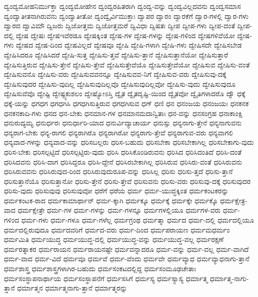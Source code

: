 {ದ್ವಂದ್ವಮೋಹನಿರ್ಮುಕ್ತಾ
ದ್ವಂದ್ವಮೋಹೇನ
ದ್ವಂದ್ವರಹಿತರಾಗಿ
ದ್ವಂದ್ವ-ವನ್ನು
ದ್ವಂದ್ವವಿಲ್ಲದವನು
ದ್ವಂದ್ವಸಮಾಸ
ದ್ವಂದ್ವಾತೀತನಾಗಿರುವನು
ದ್ವಂದ್ವಾತೀತೋ
ದ್ವಂದ್ವೈರ್ವಿಮುಕ್ತಾಃ
ದ್ವಾಪರ
ದ್ವಾರಂ
ದ್ವಾರಕೆಗೆ
ದ್ವಾರ-ಗಳಲ್ಲಿ
ದ್ವಾರ-ಗಳು
ದ್ವಾರದ
ದ್ವಾವಿಮೌ
ದ್ವಿಜರು
ದ್ವಿಜೋತ್ತಮ
ದ್ವಿಜೋತ್ತಮರೆ
ದ್ವಿವಿಧಾ
ದ್ವಿಷತಃ
ದ್ವೀಪ
ದ್ವೀಪ-ಗಳು
ದ್ವೀಪ-ದಂತೆ
ದ್ವೀಪ-ದಲ್ಲಿ
ದ್ವೇಷ
ದ್ವೇಷಃ
ದ್ವೇಷಇವೆರಡೂ
ದ್ವೇಷಕ್ಕಿಂತ
ದ್ವೇಷ-ಗಳ
ದ್ವೇಷ-ಗಳನ್ನು
ದ್ವೇಷ-ಗಳಿಂದ
ದ್ವೇಷಗಳಿವೆಯೋ
ದ್ವೇಷ-ಗಳು
ದ್ವೇಷದ
ದ್ವೇಷ-ದಿಂದ
ದ್ವೇಷವಿಲ್ಲದೆ
ದ್ವೇಷವೂ
ದ್ವೇಷಿ
ದ್ವೇಷಿ-ಗಳಾಗಿ
ದ್ವೇಷಿ-ಗಳು
ದ್ವೇಷಿಸದೇ
ದ್ವೇಷಿಸಬೇಡ
ದ್ವೇಷಿಸಿದರೂ
ದ್ವೇಷಿಸಿದರೆ
ದ್ವೇಷಿ-ಸುತ್ತ
ದ್ವೇಷಿಸು-ತ್ತವೆ
ದ್ವೇಷಿಸು-ತ್ತಾನೆ
ದ್ವೇಷಿಸುತ್ತಾನೆಯೋ
ದ್ವೇಷಿಸುತ್ತಾರೆ
ದ್ವೇಷಿಸುತ್ತಿರುವ
ದ್ವೇಷಿಸು-ತ್ತೇನೆ
ದ್ವೇಷಿಸು-ತ್ತೇವೆ
ದ್ವೇಷಿಸುತ್ತೇವೆಯೊ
ದ್ವೇಷಿಸುತ್ತೇವೆಯೋ
ದ್ವೇಷಿಸುವ
ದ್ವೇಷಿಸು-ವಂತೆ
ದ್ವೇಷಿಸುವನೊ
ದ್ವೇಷಿಸು-ವರು
ದ್ವೇಷಿಸುವವನನ್ನೂ
ದ್ವೇಷಿಸುವವ-ನಿಗೆ
ದ್ವೇಷಿಸುವ-ವರು
ದ್ವೇಷಿಸುವು-ದಕ್ಕೆ
ದ್ವೇಷಿಸುವುದರ
ದ್ವೇಷಿಸು-ವುದಿಲ್ಲ
ದ್ವೇಷಿಸುವುದಿಲ್ಲವೊ
ದ್ವೇಷಿಸುವುದಿಲ್ಲವೋ
ದ್ವೇಷಿಸು-ವುದು
ದ್ವೇಷಿಸುವುದೂ
ದ್ವೇಷಿಸುವೆವೊ
ದ್ವೇಷ್ಟಿ
ದ್ವೇಷ್ಟ್ಯಕುಶಲಂ
ದ್ವೇಷ್ಯೋಽಸ್ತಿ
ದ್ವೈತ
ದ್ವೈತದೃಷ್ಟಿ-ಯಿಂದ
ದ್ವೈತವೋ
ದ್ವೈತಿಗಳಾದರೊ
ದ್ವೌ
ಧಕ್ಕೆ
ಧಕ್ಕೆ-ಯನ್ನು
ಧಗಧಗ
ಧಗಧಗಿಸಿ
ಧಗಧಗಿಸುತ್ತಿರುವ
ಧಗಧಗಿಸುವ
ಧಗ್
ಧಣಿ
ಧನ
ಧನಂಜಯ
ಧನಂಜಯಃ
ಧನಕನಕ
ಧನಕನಕಾದಿ-ಗಳು
ಧನದ
ಧನ-ಬೇಕು
ಧನಮಾನ-ಗಳ
ಧನಮಾನಮದಾನ್ವಿತಾಃ
ಧನ-ವನ್ನು
ಧನಸಂಗ್ರಹ
ಧನಾಕಾಂಕ್ಷಿ
ಧನುರುದ್ಯಮ್ಯ
ಧನುರ್ಧರಃ
ಧನುರ್ಧಾರಿ-ಯಾದ
ಧನುರ್ವಿದ್ಯಾಚಾರ್ಯ
ಧನುಸ್ಸು
ಧನ್ಯನಾಗು-ತ್ತೇನೆ
ಧನ್ಯನಾಗುವನು
ಧನ್ಯರಾಗ-ಬೇಕು
ಧನ್ಯ-ರಾಗಲಿ
ಧನ್ಯರಾಗಿರೊ
ಧನ್ಯರಾಗಿರೋ
ಧನ್ಯರಾಗು-ತ್ತೇವೆ
ಧನ್ಯರಾಗುವ-ವರು
ಧನ್ಯವಾಗಲಿ
ಧನ್ಯವಾದ-ಗಳನ್ನು
ಧನ್ಯವಾದ-ವನ್ನು
ಧರಿಸಬಲ್ಲರು
ಧರಿಸ-ಬಹುದು
ಧರಿಸಬೇಕಾ
ಧರಿಸಬೇಕಾಗಿಲ್ಲ
ಧರಿಸಬೇಕಾಗು-ವುದು
ಧರಿಸ-ಬೇಕು
ಧರಿಸಲ್ಪಟ್ಟಿದೆ
ಧರಿಸಲ್ಪಟ್ಟಿರು-ವುದು
ಧರಿಸಿ
ಧರಿಸಿಕೊಂಡಿರುವನು
ಧರಿಸಿದ
ಧರಿಸಿದಂತಿದೆ
ಧರಿಸಿ-ದಂತೆ
ಧರಿಸಿದವನು
ಧರಿಸಿ-ದಾಗ
ಧರಿಸಿದ್ದರೂ
ಧರಿಸಿ-ದ್ದೇನೆ
ಧರಿಸಿರಬೇಕಾಗಿಲ್ಲ
ಧರಿಸಿರುವ
ಧರಿಸಿರು-ವಂತೆ
ಧರಿಸಿರುವನು
ಧರಿಸಿರುವವನು
ಧರಿಸಿರುವುದ-ರಿಂದ
ಧರಿಸಿರುವುದುರೂಪ-ವನ್ನು
ಧರಿಸಿಲ್ಲ
ಧರಿಸು
ಧರಿಸು-ತ್ತದೆ
ಧರಿಸು-ತ್ತಾನೆ
ಧರಿಸುತ್ತಾನೆಯೊ
ಧರಿಸುತ್ತಾನೋ
ಧರಿಸು-ತ್ತೇನೆ
ಧರಿಸು-ತ್ತೇವೆ
ಧರಿಸುವನು
ಧರಿಸು-ವರು
ಧರಿಸುವು-ದಕ್ಕೆ
ಧರಿಸುವುದರ
ಧರಿಸು-ವುದು
ಧರಿಸುವುವು
ಧರಿಸುವುವೋ
ಧರೆಗೆ
ಧರೆಯ
ಧರ್ಮ
ಧರ್ಮ-ಯುದ್ಧಕ್ಕಿಂತ
ಧರ್ಮಕಂಟಕರನ್ನು
ಧರ್ಮಕಂಟಕ-ರಾದ
ಧರ್ಮಕಾಮಾರ್ಥಾನ್
ಧರ್ಮ-ಕ್ಕಾಗಿ
ಧರ್ಮಕ್ಕೂ
ಧರ್ಮಕ್ಕೆ
ಧರ್ಮಕ್ಕೇ
ಧರ್ಮಕ್ಕೊ
ಧರ್ಮಕ್ಷೇತ್ರ-ವಾದ
ಧರ್ಮಕ್ಷೇತ್ರೇ
ಧರ್ಮ-ಗಳ
ಧರ್ಮ-ಗಳನ್ನು
ಧರ್ಮ-ಗಳನ್ನೂ
ಧರ್ಮಗಳಲ್ಲಿಯೂ
ಧರ್ಮಗಳ-ವರು
ಧರ್ಮ-ಗಳಿಂದ
ಧರ್ಮ-ಗಳು
ಧರ್ಮ-ಗಳೂ
ಧರ್ಮ-ಗಳೆಲ್ಲ
ಧರ್ಮಗ್ರಂಥ
ಧರ್ಮತ್ಮಾ
ಧರ್ಮದ
ಧರ್ಮ-ದಲ್ಲಿ
ಧರ್ಮದಲ್ಲಿಯೂ
ಧರ್ಮದಲ್ಲಿರುವುದೂ
ಧರ್ಮದವರಿಗೆ
ಧರ್ಮದ-ವರು
ಧರ್ಮ-ದಿಂದ
ಧರ್ಮಪರಾಯಣ
ಧರ್ಮಮಧರ್ಮಂ
ಧರ್ಮಮಿತಿ
ಧರ್ಮಯುದ್ಧ
ಧರ್ಮಯುದ್ಧ-ದಲ್ಲಿ
ಧರ್ಮಯುದ್ಧ-ವನ್ನು
ಧರ್ಮಯುದ್ಧ-ವಲ್ಲ
ಧರ್ಮರಕ್ಷಣೆ
ಧರ್ಮರತ್ನಾಕರ
ಧರ್ಮರಾಯನ
ಧರ್ಮರಾಯನಷ್ಟೇ
ಧರ್ಮವನ್ನಾದರೂ
ಧರ್ಮ-ವನ್ನು
ಧರ್ಮ-ವಲ್ಲ
ಧರ್ಮ-ವಾಗಿದೆ
ಧರ್ಮ-ವಾದ
ಧರ್ಮ-ವಿದೆ
ಧರ್ಮವೂ
ಧರ್ಮವೆ
ಧರ್ಮ-ವೆಂದು
ಧರ್ಮವೇ
ಧರ್ಮವ್ಯಾಧ
ಧರ್ಮವ್ಯಾಧನಾಗು-ತ್ತಾನೆ
ಧರ್ಮಶಾಸ್ತ್ರ
ಧರ್ಮಶಾಸ್ತ್ರಗಳಾಗಿರ-ಬಹುದು
ಧರ್ಮಸಂಕಟದಲ್ಲಿದ್ದ
ಧರ್ಮಸಂಮೂಢಚೇತಾಃ
ಧರ್ಮಸಂಸ್ಥಾಪನಾರ್ಥಾಯ
ಧರ್ಮಸಂಸ್ಥಾಪನೆಗೆ
ಧರ್ಮಸಸಿಗೆ
ಧರ್ಮಸ್ಯ
ಧರ್ಮಸ್ಯಾಸ್ಯ
ಧರ್ಮಾತ್ಮ
ಧರ್ಮಾತ್ಮ-ನಾಗು-ತ್ತಾನೆ
ಧರ್ಮಾತ್ಮನ
ಧರ್ಮಾತ್ಮನಾಗು-ತ್ತಾನೆ
ಧರ್ಮಾತ್ಮರನ್ನು
}
